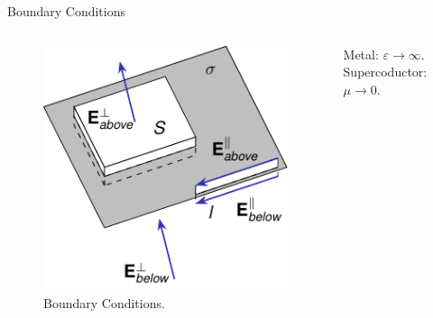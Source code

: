 \begin{frame}{Boundary Conditions}
\begin{columns}
    \vspace{-10mm}
    \begin{figure}[!htb]
        \centering
        \includegraphics[width=\textwidth]{Figures/Boundary_conditions.pdf}
        \caption{Boundary Conditions.}
        \label{Boudary_conditions}
        \end{figure}
        \vspace{-3mm}
        Metal: \( \varepsilon \rightarrow \infty\). \\
        Supercoductor: \( \mu \rightarrow 0\).

        

\end{columns}
\end{frame}